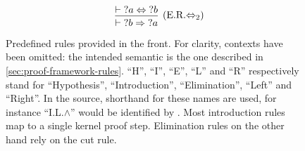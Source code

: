 \begin{figure}[H]
\begin{framed}
$$\begin{array}{c c}
  & \frule{\vdash {?a} \Leftrightarrow {?b}}{\vdash {?b} \Rightarrow {?a}}{E.R.$\Leftrightarrow_2$}
  \end{array}$$
  \end{framed}
  \caption[Rules (1)]{Predefined rules provided in the front. For clarity, contexts have been omitted: the intended semantic is the one described in \autoref{sec:proof-framework-rules}. ``H'', ``I'', ``E'', ``L'' and ``R'' respectively stand for ``Hypothesis'', ``Introduction'', ``Elimination'', ``Left'' and ``Right''. In the source, shorthand for these names are used, for instance ``I.L.$\land$'' would be identified by . Most introduction rules map to a single kernel proof step. Elimination rules on the other hand rely on the cut rule.}
  \label{fig:rules-list-1}
\end{figure}

